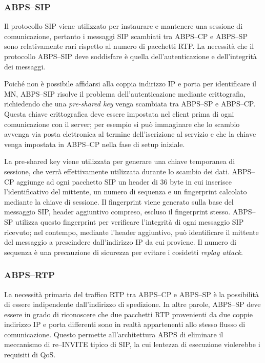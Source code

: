 \documentclass[12pt,a4paper,openright,twoside]{book}
\begin{document}
\subsubsection{ABPS--SIP}

Il protocollo SIP viene utilizzato per instaurare e mantenere una
sessione di comunicazione, pertanto i messaggi SIP scambiati tra
ABPS--CP e ABPS--SP sono relativamente rari rispetto al numero di
pacchetti RTP. La necessità che il protocollo ABPS--SIP deve
soddisfare è quella dell'autenticazione e dell'integrità dei
messaggi.

Poiché non è possibile affidarsi alla coppia indirizzo IP e porta per
identificare il MN, ABPS--SIP risolve il problema dell'autenticazione
mediante crittografia, richiedendo che una \emph{pre-shared key} venga
scambiata tra ABPS--SP e ABPS--CP. Questa chiave crittografica deve
essere impostata nel client prima di ogni comunicazione con il server;
per esempio si può immaginare che lo scambio avvenga via posta
elettronica al termine dell'iscrizione al servizio e che la chiave
venga impostata in ABPS--CP nella fase di setup iniziale.

La pre-shared key viene utilizzata per generare una chiave temporanea
di sessione, che verrà effettivamente utilizzata durante lo scambio
dei dati. ABPS--CP aggiunge ad ogni pacchetto SIP un header di 36 byte
in cui inserisce l'identificativo del mittente, un numero di sequenza
e un fingerprint calcolato mediante la chiave di sessione. Il
fingerprint viene generato sulla base del messaggio SIP, header
aggiuntivo compreso, escluso il fingerprint stesso. ABPS--SP utilizza
questo fingerprint per verificare l'integrità di ogni messaggio SIP
ricevuto; nel contempo, mediante l'header aggiuntivo, può identificare
il mittente del messaggio a prescindere dall'indirizzo IP da cui
proviene. Il numero di sequenza è una precauzione di sicurezza per
evitare i cosidetti \emph{replay attack}.

\subsubsection{ABPS--RTP}

La necessità primaria del traffico RTP tra ABPS--CP e ABPS--SP è la
possibilità di essere indipendente dall'indirizzo di spedizione. In
altre parole, ABPS--SP deve essere in grado di riconoscere che due
pacchetti RTP provenienti da due coppie indirizzo IP e porta
differenti sono in realtà appartenenti allo stesso flusso di
comunicazione. Questo permette all'architettura ABPS di eliminare il
meccanismo di re--INVITE tipico di SIP, la cui lentezza di esecuzione
violerebbe i requisiti di QoS.
\end{document}
